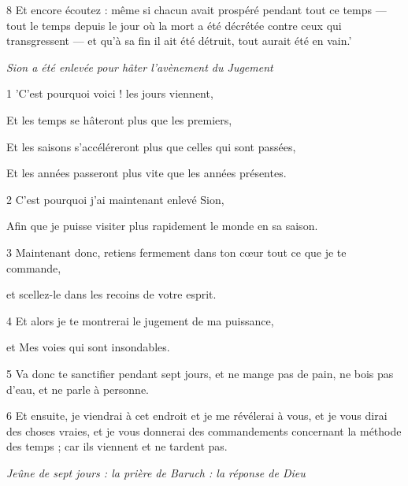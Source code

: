 \par 8 Et encore écoutez : même si chacun avait prospéré pendant tout ce temps — tout le temps depuis le jour où la mort a été décrétée contre ceux qui transgressent — et qu'à sa fin il ait été détruit, tout aurait été en vain.'


\par \textit{Sion a été enlevée pour hâter l'avènement du Jugement}

\par 1 'C'est pourquoi voici ! les jours viennent,

\par Et les temps se hâteront plus que les premiers,

\par Et les saisons s'accéléreront plus que celles qui sont passées,

\par Et les années passeront plus vite que les années présentes.

\par 2 C'est pourquoi j'ai maintenant enlevé Sion,

\par Afin que je puisse visiter plus rapidement le monde en sa saison.

\par 3 Maintenant donc, retiens fermement dans ton cœur tout ce que je te commande,

\par et scellez-le dans les recoins de votre esprit.

\par 4 Et alors je te montrerai le jugement de ma puissance,

\par et Mes voies qui sont insondables.

\par 5 Va donc te sanctifier pendant sept jours, et ne mange pas de pain, ne bois pas d'eau, et ne parle à personne.

\par 6 Et ensuite, je viendrai à cet endroit et je me révélerai à vous, et je vous dirai des choses vraies, et je vous donnerai des commandements concernant la méthode des temps ; car ils viennent et ne tardent pas.


\par \textit{Jeûne de sept jours : la prière de Baruch : la réponse de Dieu}


